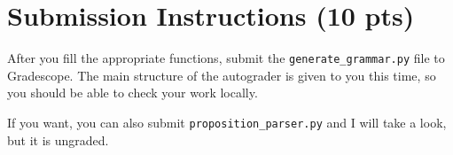 \documentclass{article}
\begin{document}


    
\section*{Submission Instructions (10 pts)}
    After you fill the appropriate functions, submit the \lstinline{generate_grammar.py} file to Gradescope. The main structure of the autograder is given to you this time, so you should be able to check your work locally.

    \vspace{2mm}
    If you want, you can also submit \lstinline{proposition_parser.py} and I will take a look, but it is ungraded.

\end{document}
